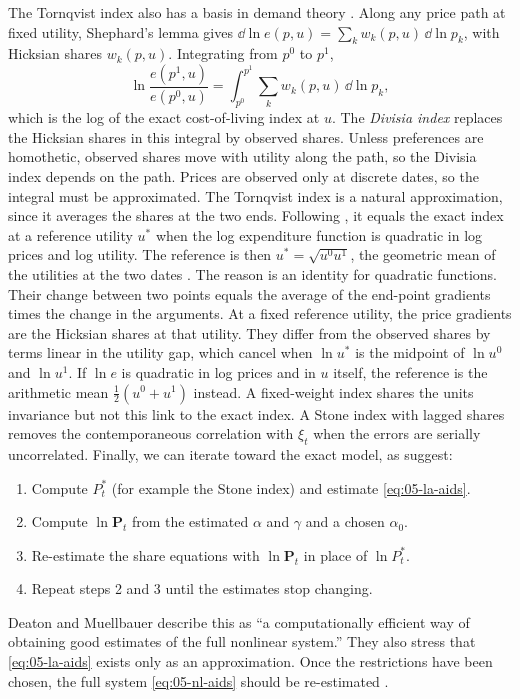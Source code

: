 The Tornqvist index also has a basis in demand theory \citep[\S 7.1, eqs.~1.8--1.10,
pp.~174--175]{DeatonMuellbauer1980b}. Along any price path at fixed utility, Shephard's lemma gives
$\dd\ln e(p, u) = \sum_k w_k(p, u)\,\dd\ln p_k$, with Hicksian shares $w_k(p, u)$. Integrating from $p^0$
to $p^1$,
\begin{equation*}
  \ln\frac{e(p^1, u)}{e(p^0, u)} = \int_{p^0}^{p^1}\sum_k w_k(p, u)\,\dd\ln p_k ,
\end{equation*}
which is the log of the exact cost-of-living index at $u$. The \emph{Divisia index} replaces the Hicksian
shares in this integral by observed shares. Unless preferences are homothetic, observed shares move with
utility along the path, so the Divisia index depends on the path. Prices are observed only at discrete
dates, so the integral must be approximated. The Tornqvist index is a natural approximation, since it
averages the shares at the two ends. Following \citet{Diewert1976}, it equals the exact index at a
reference utility $u^*$ when the log expenditure function is quadratic in log prices and log utility. The
reference is then $u^* = \sqrt{u^0u^1}$, the geometric mean of the utilities at the two dates \citep[p.~174]{DeatonMuellbauer1980b}.
The reason is an identity for quadratic functions. Their change between two points equals the average of
the end-point gradients times the change in the arguments. At a fixed reference utility, the price
gradients are the Hicksian shares at that utility. They differ from the observed shares by terms linear
in the utility gap, which cancel when $\ln u^*$ is the midpoint of $\ln u^0$ and $\ln u^1$. If $\ln e$ is
quadratic in log prices and in $u$ itself, the reference is the arithmetic mean $\frac{1}{2}(u^0 + u^1)$
instead. A fixed-weight index shares the units invariance but not this link to the
exact index. A Stone index with lagged
shares removes the contemporaneous correlation with $\xi_t$ when the errors are serially uncorrelated.
Finally, we can iterate toward the exact model, as \citet[p.~321]{DeatonMuellbauer1980a} suggest:
\begin{enumerate}[label=\arabic*.]
  \item Compute $P^*_t$ (for example the Stone index) and estimate \eqref{eq:05-la-aids}.
  \item Compute $\ln\mathbf{P}_t$ from the estimated $\alpha$ and $\gamma$ and a chosen $\alpha_0$.
  \item Re-estimate the share equations with $\ln\mathbf{P}_t$ in place of $\ln P^*_t$.
  \item Repeat steps 2 and 3 until the estimates stop changing.
\end{enumerate}
Deaton and Muellbauer describe this as ``a computationally efficient way of obtaining good estimates of
the full nonlinear system.'' They also stress that \eqref{eq:05-la-aids} exists only as an approximation.
Once the restrictions have been chosen, the full system \eqref{eq:05-nl-aids} should be re-estimated
\citep[p.~317]{DeatonMuellbauer1980a}.

